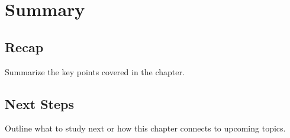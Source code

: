 \section{Summary}
\subsection*{Recap}
Summarize the key points covered in the chapter.
\subsection*{Next Steps}
Outline what to study next or how this chapter connects to upcoming topics.
